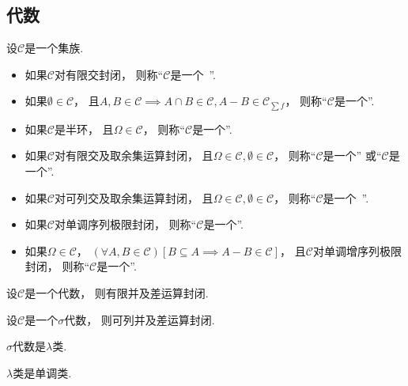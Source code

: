 \subsection{代数}
\begin{definition}
设\(\mathcal{C}\)是一个集族.
\begin{itemize}
	\item 如果\(\mathcal{C}\)对有限交封闭，
	则称“\(\mathcal{C}\)是一个~”.
	\item 如果\(\emptyset\in\mathcal{C}\)，
	且\(A,B\in\mathcal{C} \implies A \cap B \in \mathcal{C}, A-B \in \mathcal{C}_{\sum f}\)，
	则称“\(\mathcal{C}\)是一个”.
	\item 如果\(\mathcal{C}\)是半环，
	且\(\Omega\in\mathcal{C}\)，
	则称“\(\mathcal{C}\)是一个”.
	\item 如果\(\mathcal{C}\)对有限交及取余集运算封闭，
	且\(\Omega\in\mathcal{C},
	\emptyset\in\mathcal{C}\)，
	则称“\(\mathcal{C}\)是一个”
	或“\(\mathcal{C}\)是一个”.
	\item 如果\(\mathcal{C}\)对可列交及取余集运算封闭，
	且\(\Omega\in\mathcal{C},
	\emptyset\in\mathcal{C}\)，
	则称“\(\mathcal{C}\)是一个~”.
	\item 如果\(\mathcal{C}\)对单调序列极限封闭，
	则称“\(\mathcal{C}\)是一个”.
	\item 如果\(\Omega\in\mathcal{C}\)，
	\((\forall A,B\in\mathcal{C})[B \subseteq A \implies A-B\in\mathcal{C}]\)，
	且\(\mathcal{C}\)对单调增序列极限封闭，
	则称“\(\mathcal{C}\)是一个”.
\end{itemize}
\end{definition}

\begin{proposition}
设\(\mathcal{C}\)是一个代数，
则有限并及差运算封闭.
\end{proposition}
\begin{proposition}
设\(\mathcal{C}\)是一个\(\sigma\)代数，
则可列并及差运算封闭.
\end{proposition}

\begin{proposition}
\(\sigma\)代数是\(\lambda\)类.
\end{proposition}
\begin{proposition}
\(\lambda\)类是单调类.
\end{proposition}

